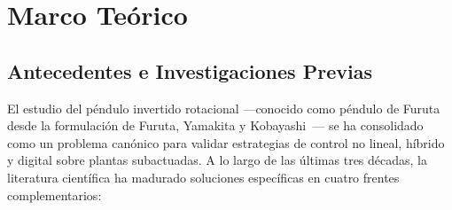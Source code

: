 \section{Marco Teórico}\label{sec:marco_teorico}

\subsection{Antecedentes e Investigaciones Previas}\label{subsec:antecedentes}

El estudio del péndulo invertido rotacional ---conocido como péndulo de Furuta desde la formulación de Furuta, Yamakita y Kobayashi~\cite{furuta1991}--- se ha consolidado como un problema canónico para validar estrategias de control no lineal, híbrido y digital sobre plantas subactuadas. A lo largo de las últimas tres décadas, la literatura científica ha madurado soluciones específicas en cuatro frentes complementarios:


